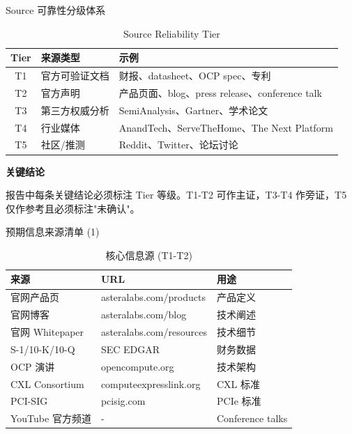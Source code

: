 \documentclass[UTF8,11pt,aspectratio=169]{beamer}
\newenvironment{keypoint}{
    \begin{block}{\textbf{\twemoji{key} 关键结论}}
}{
    \end{block}
}
\begin{document}
\begin{frame}{Source 可靠性分级体系}
    \begin{table}
        \centering
        \caption{Source Reliability Tier}
        \begin{tabular}{cll}
            \toprule
            \textbf{Tier} & \textbf{来源类型} & \textbf{示例} \\
            \midrule
            \rowcolor{darkgreen!15}
            T1 & 官方可验证文档 & 财报、datasheet、OCP spec、专利 \\
            \rowcolor{darkgreen!10}
            T2 & 官方声明 & 产品页面、blog、press release、conference talk \\
            \rowcolor{yellow!15}
            T3 & 第三方权威分析 & SemiAnalysis、Gartner、学术论文 \\
            \rowcolor{orange!15}
            T4 & 行业媒体 & AnandTech、ServeTheHome、The Next Platform \\
            \rowcolor{red!15}
            T5 & 社区/推测 & Reddit、Twitter、论坛讨论 \\
            \bottomrule
        \end{tabular}
    \end{table}

    \begin{keypoint}
        报告中每条关键结论必须标注 Tier 等级。T1-T2 可作主证，T3-T4 作旁证，T5 仅作参考且必须标注"未确认"。
    \end{keypoint}
\end{frame}

\begin{frame}{预期信息来源清单 (1)}
    \begin{table}
        \centering
        \caption{核心信息源 (T1-T2)}
        \begin{tabular}{lll}
            \toprule
            \textbf{来源} & \textbf{URL} & \textbf{用途} \\
            \midrule
            官网产品页 & asteralabs.com/products & 产品定义 \\
            官网博客 & asteralabs.com/blog & 技术阐述 \\
            官网 Whitepaper & asteralabs.com/resources & 技术细节 \\
            S-1/10-K/10-Q & SEC EDGAR & 财务数据 \\
            OCP 演讲 & opencompute.org & 技术架构 \\
            CXL Consortium & computeexpresslink.org & CXL 标准 \\
            PCI-SIG & pcisig.com & PCIe 标准 \\
            YouTube 官方频道 & - & Conference talks \\
            \bottomrule
        \end{tabular}
    \end{table}
\end{frame}
\end{document}
